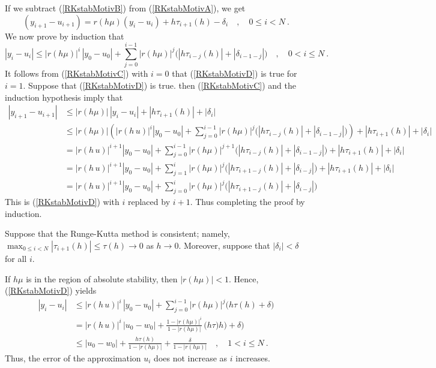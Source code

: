 \begin{rmk}
If we subtract (\ref{RKstabMotivB}) from (\ref{RKstabMotivA}), we get
\begin{equation}\label{RKstabMotivC}
  (y_{i+1}-u_{i+1}) = r(h\mu) (y_i-u_i) + h\tau_{i+1}(h) - \delta_i \quad ,
\quad 0\leq i < N \ .
\end{equation}
We now prove by induction that
\begin{equation}\label{RKstabMotivD}
|y_i-u_i| \leq |r(h\mu)|^i\, |y_0-u_0| + \sum_{j=0}^{i-1}
|r(h\mu)|^j \big( |h\tau_{i-j}(h)| + |\delta_{i-1-j}|\big) \quad ,
\quad 0 < i \leq N \ .
\end{equation}
It follows from (\ref{RKstabMotivC}) with $i=0$ that
(\ref{RKstabMotivD}) is true for $i=1$.  Suppose that (\ref{RKstabMotivD})
is true. then (\ref{RKstabMotivC}) and the induction hypothesis imply that
\begin{align*}
|y_{i+1}-u_{i+1}| &\leq |r(h\mu)|\,|y_i-u_i| + |h\tau_{i+1}(h)| + |\delta_i| \\
&\leq |r(h\mu)| \left(|r(h\,u)|^i |y_0-u_0| + \sum_{j=0}^{i-1}
|r(h\mu)|^j \big( |h\tau_{i-j}(h)| + |\delta_{i-1-j}|\big) \right)
+ |h \tau_{i+1}(h)| + |\delta_i| \\
&= |r(h\,u)|^{i+1} |y_0-u_0| + \sum_{j=0}^{i-1}
|r(h\mu)|^{j+1} \big(|h\tau_{i-j}(h)| + |\delta_{i-1-j}|\big)
+ |h\tau_{i+1}(h)| + |\delta_i| \\
&= |r(h\,u)|^{i+1} |y_0-u_0| + \sum_{j=1}^i
|r(h\mu)|^j \big(|h\tau_{i+1-j}(h)| + |\delta_{i-j}|\big)
+ |h\tau_{i+1}(h)| + |\delta_i| \\
&= |r(h\,u)|^{i+1} |y_0-u_0| + \sum_{j=0}^i
|r(h\mu)|^j \big(|h\tau_{i+1-j}(h)| + |\delta_{i-j}|\big)
\end{align*}
This is (\ref{RKstabMotivD}) with $i$ replaced by $i+1$.  Thus completing
the proof by induction.

Suppose that the Runge-Kutta method is consistent; namely,
$\displaystyle \max_{0\leq i <N} |\tau_{i+1}(h)| \leq \tau(h) \to 0$
as $h\to 0$.  Moreover, suppose that $|\delta_i| < \delta$ for all $i$.

If $h\mu$ is in the region of absolute stability, then $|r(h\mu)|<1$.
Hence, (\ref{RKstabMotivD}) yields
\begin{align*}
|y_i-u_i| &\leq |r(h\,u)|^i\, |y_0-u_0| +
\sum_{j=0}^{i-1} |r(h\mu)|^j \big( h\tau(h) + \delta \big) \\
&= |r(h\,u)|^i\, |u_0-w_0| + \frac{1 - |r(h\mu)|^i}{1-|r(h\mu)|}\,
\big( h\tau)h) + \delta \big) \\
&\leq |u_0-w_0| + \frac{h\tau(h)}{1-|r(h\mu)|} + \frac{\delta}{1-|r(h\mu)|}
\quad , \quad 1<i \leq N \ .
\end{align*}
Thus, the error of the approximation $u_i$ does not increase as $i$
increases.


\end{rmk}
